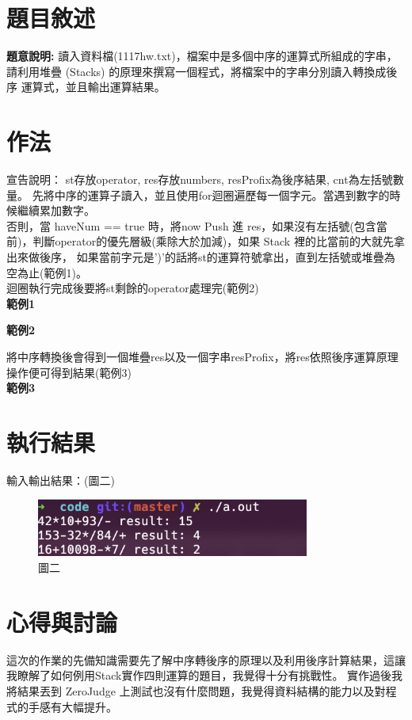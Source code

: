 \documentclass[12pt, a4paper]{article}
\begin{document}
  \section{\fontsize{20pt}{22pt}\selectfont 題目敘述}
  \begin{samepage}
    \fontsize{16pt}{18pt} \selectfont
        \textbf{題意說明:} 讀入資料檔(1117hw.txt)，檔案中是多個中序的運算式所組成的字串，
        請利用堆疊 (Stacks) 的原理來撰寫一個程式，將檔案中的字串分別讀入轉換成後序
        運算式，並且輸出運算結果。
  \end{samepage}


  \section{\fontsize{20pt}{22pt}\selectfont 作法}
  \begin{samepage}
    \fontsize{16pt}{18pt} \selectfont
      宣告說明： st存放operator, res存放numbers, resProfix為後序結果, cnt為左括號數量。
      先將中序的運算子讀入，並且使用for迴圈遍歷每一個字元。當遇到數字的時候繼續累加數字。\\
      否則，當 haveNum == true 時，將now Push 進 res，如果沒有左括號(包含當前)，判斷operator的優先層級(乘除大於加減)，如果 Stack 裡的比當前的大就先拿出來做後序，
      如果當前字元是')'的話將st的運算符號拿出，直到左括號或堆疊為空為止(範例1)。\\
      迴圈執行完成後要將st剩餘的operator處理完(範例2) \\
      \textbf{範例1}  
      
      \textbf{範例2}
      
      將中序轉換後會得到一個堆疊res以及一個字串resProfix，將res依照後序運算原理操作便可得到結果(範例3) \\
      \textbf{範例3}
      
      \normalfont
  \end{samepage}

  \section{\fontsize{20pt}{22pt}\selectfont 執行結果}
      \fontsize{16pt}{18pt} \selectfont
        輸入輸出結果：(圖二)
        \begin{figure}[ht]
          \centering
          \includegraphics[width=0.8\textwidth]{./Image/screenshot.png}
          \caption{圖二}
        \end{figure}
      \normalsize

  \section{\fontsize{20pt}{22pt}\selectfont 心得與討論}
  \begin{samepage}
    \fontsize{16pt}{18pt} \selectfont
    這次的作業的先備知識需要先了解中序轉後序的原理以及利用後序計算結果，這讓我瞭解了如何例用Stack實作四則運算的題目，我覺得十分有挑戰性。
    實作過後我將結果丟到 ZeroJudge 上測試也沒有什麼問題，我覺得資料結構的能力以及對程式的手感有大幅提升。
    \normalfont
  \end{samepage}
\end{document}

